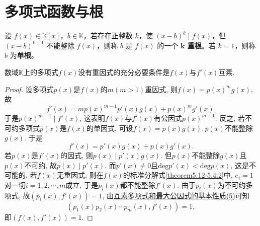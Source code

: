 \documentclass[../../main.tex]{subfiles}%
\begin{document}
\section{多项式函数与根}

\begin{definition}[多项式的重根]\label{definition:多项式的重根}
设 $f(x) \in \mathbb{K}[x]$，$b \in \mathbb{K}$，若存在正整数 $k$，使 $(x - b)^k \mid f(x)$，但 $(x - b)^{k+1}$ 不能整除 $f(x)$，则称 $b$ 是 $f(x)$ 的一个 \textbf{$\boldsymbol{k}$ 重根}。若 $k = 1$，则称 $b$ 为\textbf{单根}。
\end{definition}

\begin{theorem}[多项式没有重因式的充要条件]\label{theorem:多项式没有重因式的充要条件}
数域\(\mathbb{K}\)上的多项式\(f(x)\)没有重因式的充分必要条件是\(f(x)\)与\(f'(x)\)互素.
\end{theorem}
\begin{proof}
设多项式\(p(x)\)是\(f(x)\)的\(m(m > 1)\)重因式, 则\(f(x)=p(x)^mg(x)\), 故
\[
f'(x)=mp(x)^{m - 1}p'(x)g(x)+p(x)^mg'(x).
\]
于是\(p(x)^{m - 1}\mid f'(x)\), 这表明\(f(x)\)与\(f'(x)\)有公因式\(p(x)^{m - 1}\).
反之, 若不可约多项式\(p(x)\)是\(f(x)\)的单因式, 可设\(f(x)=p(x)g(x), p(x)\)不能整除\(g(x)\). 于是
\[
f'(x)=p'(x)g(x)+p(x)g'(x).
\]
若\(p(x)\)是\(f'(x)\)的因式, 则\(p(x)\mid p'(x)g(x)\). 但\(p(x)\)不能整除\(g(x)\)且\(p(x)\)不可约, 故\(p(x)\mid p'(x)\). 而\(p'(x)\neq 0\)且\(\mathrm{deg }p'(x)<\mathrm{deg }p(x)\), 这是不可能的. 若\(f(x)\)无重因式, 则在\(f(x)\)的标准分解式\eqref{theorem5.12-5.4.2}中, \(e_i = 1\)对一切\(i = 1,2,\cdots,m\)成立, 于是\(p_i(x)\)都不能整除\(f'(x)\). 由于\(p_i(x)\)为不可约多项式, 故\((p_i(x),f'(x)) = 1\), 由\hyperref[proposition:互素多项式和最大公因式的基本性质]{互素多项式和最大公因式的基本性质(5)}可知
\[
(p_1(x)p_2(x)\cdots p_m(x),f'(x)) = 1,
\]
即\((f(x),f'(x)) = 1\).
\end{proof}
\end{document}
